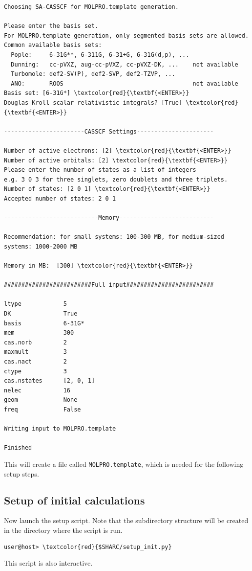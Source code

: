 \documentclass[a4paper,11pt,DIV=15,openany]{scrbook}
\newcommand{\ttt}[1]{\texttt{#1}}
\begin{document}
\begin{oframed}
\begin{Verbatim}[commandchars=\\\{\}]
Choosing SA-CASSCF for MOLPRO.template generation.

Please enter the basis set.
For MOLPRO.template generation, only segmented basis sets are allowed.
Common available basis sets:
  Pople:     6-31G**, 6-311G, 6-31+G, 6-31G(d,p), ...
  Dunning:   cc-pVXZ, aug-cc-pVXZ, cc-pVXZ-DK, ...    not available
  Turbomole: def2-SV(P), def2-SVP, def2-TZVP, ...
  ANO:       ROOS                                     not available
Basis set: [6-31G*] \textcolor{red}{\textbf{<ENTER>}}
Douglas-Kroll scalar-relativistic integrals? [True] \textcolor{red}{\textbf{<ENTER>}}

-----------------------CASSCF Settings----------------------

Number of active electrons: [2] \textcolor{red}{\textbf{<ENTER>}}
Number of active orbitals: [2] \textcolor{red}{\textbf{<ENTER>}}
Please enter the number of states as a list of integers
e.g. 3 0 3 for three singlets, zero doublets and three triplets.
Number of states: [2 0 1] \textcolor{red}{\textbf{<ENTER>}}
Accepted number of states: 2 0 1

---------------------------Memory---------------------------

Recommendation: for small systems: 100-300 MB, for medium-sized systems: 1000-2000 MB

Memory in MB:  [300] \textcolor{red}{\textbf{<ENTER>}}

#########################Full input#########################

ltype            5
DK               True
basis            6-31G*
mem              300
cas.norb         2
maxmult          3
cas.nact         2
ctype            3
cas.nstates      [2, 0, 1]
nelec            16
geom             None
freq             False

Writing input to MOLPRO.template

Finished

\end{Verbatim}
\end{oframed}

\normalsize
This will create a file called \ttt{MOLPRO.template}, which is needed for the following setup steps.

\subsection{Setup of initial calculations}

Now launch the setup script. Note that the subdirectory structure will be created in the directory where the script is run.
\begin{Verbatim}[commandchars=\\\{\}]
user@host> \textcolor{red}{$SHARC/setup_init.py}
\end{Verbatim}
This script is also interactive. 
\end{document}
